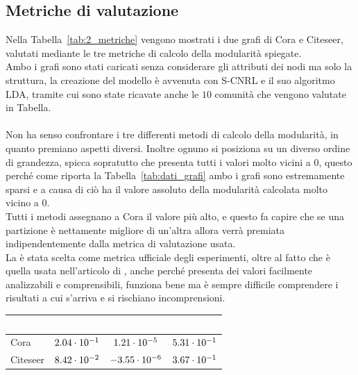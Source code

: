 \subsection{Metriche di valutazione}
Nella Tabella~\ref{tab:2_metriche} vengono mostrati i due grafi di Cora e Citeseer, valutati mediante le tre metriche di calcolo della modularità spiegate.\\
Ambo i grafi sono stati caricati senza considerare gli attributi dei nodi ma solo la struttura, la creazione del modello è avvenuta con S-CNRL e il suo algoritmo LDA, tramite cui sono state ricavate anche le $10$ comunità che vengono  valutate in Tabella.\\
\\
Non ha senso confrontare i tre differenti metodi di calcolo della modularità, in quanto premiano aspetti diversi. Inoltre ognuno si posiziona su un diverso ordine di grandezza, spicca sopratutto \mover che presenta tutti i valori molto vicini a 0, questo perché come riporta la Tabella~\ref{tab:dati_grafi} ambo i grafi sono estremamente sparsi e a causa di ciò \mover ha il valore assoluto della modularità calcolata molto vicino a $0$.\\
Tutti i metodi assegnano a Cora il valore più alto, e questo fa capire che se una partizione è nettamente migliore di un'altra allora verrà premiata indipendentemente dalla metrica di valutazione usata.\\
La \mmod è stata scelta come metrica ufficiale degli esperimenti, oltre al fatto che è quella usata nell'articolo di \cnrl, anche perché presenta dei valori facilmente analizzabili e comprensibili, \mover funziona bene ma è sempre difficile comprendere i risultati a cui s'arriva e si rischiano incomprensioni.
%
\begin{center}
	\begin{tabular}{|l|c|c|c|} %
		\hline
		\ & \mmax & \mover & \mmod \\
		\hline
		Cora & $2.04 \cdot 10^{-1}$ & $1.21 \cdot 10^{-5}$ & $5.31 \cdot 10^{-1}$ \\
		Citeseer & $8.42 \cdot 10^{-2}$ & $-3.55 \cdot 10^{-6}$ & $3.67 \cdot 10^{-1}$ \\
		\hline
	\end{tabular}
	\label{tab:2_metriche}
\end{center}
%
